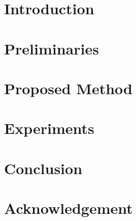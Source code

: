 \documentclass[10pt]{jarticle}
\begin{document}
\maketitle



\section{Introduction}\label{sec:Introduction}



\section{Preliminaries}\label{sec:Preliminaries}


\section{Proposed Method}\label{sec:ProposedMethod}



\section{Experiments}\label{sec:Experiments}


\section{Conclusion}\label{sec:Conclusion}


\section*{Acknowledgement}\label{sec:Acknowledgement}



\renewcommand{\refname}{References}
\begin{spacing}{0.80}
    
    \small
    \setlength{\itemsep}{0pt}
    
\end{spacing}
\end{document}
